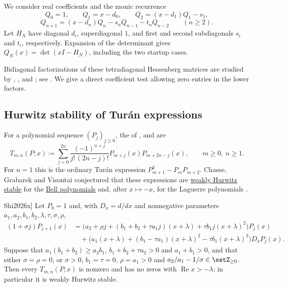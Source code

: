 We consider real coefficients and the monic recurrence
\[
 Q_0=1,\qquad Q_1=x-d_0,\qquad Q_2=(x-d_1)Q_1-s_1,
\]
\[
 Q_{n+1}=(x-d_n)Q_n-s_nQ_{n-1}-t_nQ_{n-2}\qquad(n\geq2).
\]
Let $H_N$ have diagonal $d_i$, superdiagonal $1$, and first and second
subdiagonals $s_i$ and $t_i$, respectively. Expansion of the determinant
gives $Q_N(x)=\det(xI-H_N)$, including the two startup cases.

Bidiagonal factorizations of these tetradiagonal Hessenberg matrices are
studied by , , and
; see
\cite[Lemma 3.1 and Proposition 3.2]{BranquinhoFoulquieMorenoManas2023}.
We give a direct coefficient test allowing zero entries in the lower factors.

\subsection[turanHurwitzStability]{Hurwitz stability of Turán expressions}

For a polynomial sequence $(P_j)_{j\geq0}$, the \label{extendedTuranExpression} of ,
 and 
\cite{ChasseGrabarekVisontai2015} are
\[
 T_{m,n}(P;x)\coloneqq\sum_{j=0}^{2n}\frac{(-1)^{n+j}}{j!\,(2n-j)!}
 P_{m+j}(x)P_{m+2n-j}(x),\qquad m\geq0,\ n\geq1.
\]
For $n=1$ this is the ordinary Turán expression
$P_{m+1}^2-P_mP_{m+2}$.  Chasse, Grabarek and Visontai conjectured that these
expressions are \hyperref[weakHurwitzStablePolynomial]{weakly Hurwitz stable}
for the \hyperref[touchardPolynomial]{Bell polynomials} and, after
$x\mapsto -x$, for the Laguerre polynomials
\cite[Conj.~4.3, Conj.~4.4]{ChasseGrabarekVisontai2015}.

\begin{theorem}[Shi, \cite[Thm.~1.1]{Shi2026x}]
\label{shiTuranHurwitz}
Let $P_0=1$ and, with $D_x=d/dx$ and nonnegative parameters
$a_1,a_2,b_1,b_2,\lambda,\tau,\sigma,\rho$,
\[
\begin{split}
 (1+\sigma j)P_{j+1}(x)
 &=\bigl(a_2+\rho j+(b_1+b_2+\tau a_1 j)(x+\lambda)+\tau b_1 j(x+\lambda)^2\bigr)P_j(x)\\
 &\quad+\bigl(a_1(x+\lambda)+(b_1-\tau a_1)(x+\lambda)^2-\tau b_1(x+\lambda)^3\bigr)
 D_xP_j(x).
\end{split}
\]
Suppose that $a_1(b_1+b_2)\geq a_2b_1$, $b_1+b_2+\tau a_2>0$ and
$a_1+b_1>0$, and that either $\sigma=\rho=0$, or $\sigma>0$, $b_1=\tau=0$,
$\rho=a_1>0$ and $a_2/a_1-1/\sigma\in\setZ_{\geq0}$.  Then every
$T_{m,n}(P;x)$ is nonzero and has no zeros with $\operatorname{Re}x>-\lambda$;
in particular it is weakly Hurwitz stable.
\end{theorem}

